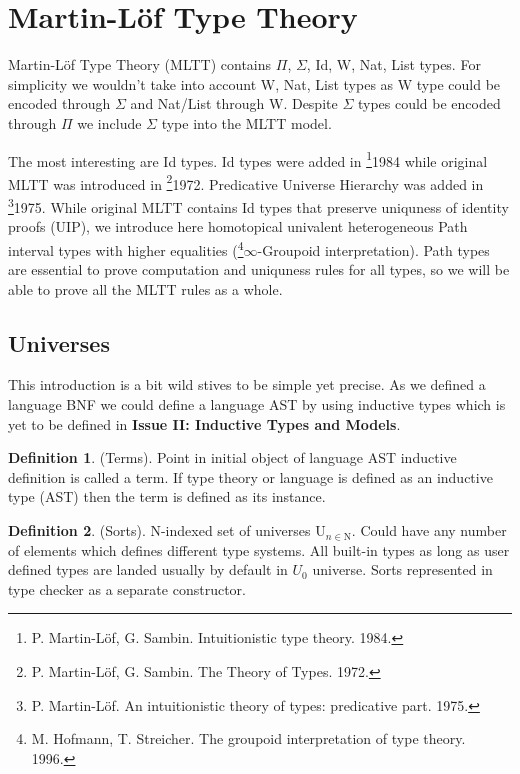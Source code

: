 \documentclass{article}
\theoremstyle{definition}
\newtheorem{definition}{Definition}
\begin{document}
\section{Martin-Löf Type Theory}

Martin-Löf Type Theory (MLTT) contains $\Pi$, $\Sigma$, Id, W, Nat, List types.
For simplicity we wouldn't take into account W, Nat, List types as
W type could be encoded through $\Sigma$ and Nat/List through W.
Despite $\Sigma$ types could be encoded through $\Pi$ we include $\Sigma$ type into the MLTT model.

The most interesting are Id types. Id types were added in \footnote{P. Martin-Löf, G. Sambin. Intuitionistic type theory. 1984.}{1984} while original MLTT was introduced in \footnote{P. Martin-Löf, G. Sambin. The Theory of Types. 1972.}{1972}.
Predicative Universe Hierarchy was added in \footnote{P. Martin-Löf. An intuitionistic theory of types: predicative part. 1975.}{1975}.
While original MLTT contains Id types that preserve uniquness of identity
proofs (UIP), we introduce here homotopical univalent heterogeneous Path
interval types with higher equalities (\footnote{M. Hofmann, T. Streicher. The groupoid interpretation of type theory. 1996.}{$\infty$-Groupoid interpretation}).
Path types are essential to prove computation and uniquness rules for all types,
so we will be able to prove all the MLTT rules as a whole.

\subsection{Universes}

This introduction is a bit wild stives to be simple yet precise.
As we defined a language BNF we could define a language AST by
using inductive types which is yet to be defined
in {\bf Issue II: Inductive Types and Models}.

\begin{definition} (Terms). Point in initial object of language AST
inductive definition is called a term. If type theory or language is defined as
an inductive type (AST) then the term is defined as its instance.
\end{definition}

\begin{definition} (Sorts). N-indexed set of universes $\mathrm{U}_{n \in \mathrm{N}}$.
Could have any number of elements which defines different type systems. All built-in
types as long as user defined types are landed usually by default in $U_0$ universe.
Sorts represented in type checker as a separate constructor.
\end{definition}
\end{document}
